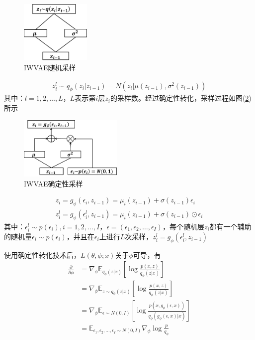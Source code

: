             \begin{figure}[H]
            \centering
            \includegraphics[height=3cm]{images/IWVAE_random_sampling.jpg}
            \caption{IWVAE随机采样}
            \label{fig:IWVAE随机采样}
            \end{figure}
            \begin{align*}
            z_i^l \sim q_\phi(z_i|z_{i-1}) = N(z_i|\mu(z_{i-1}),\sigma^2(z_{i-1}))
            \end{align*}
            其中：$l=1,2,\dots,L$，$L$表示第$i$层$z_i$的采样数。经过确定性转化，采样过程如图(\ref{fig:IWVAE确定性采样})所示
            \begin{figure}[H]
            \centering
            \includegraphics[height=3cm]{images/IWVAE_Deterministic_sampling.jpg}
            \caption{IWVAE确定性采样}
            \label{fig:IWVAE确定性采样}
            \end{figure}
            \begin{align*}
            z_i = g_\phi(\epsilon_i,z_{i-1}) = \mu_i(z_{i-1}) + \sigma(z_{i-1})\epsilon_i\\
            z_i^l = g_\phi(\epsilon_i^l,z_{i-1}) = \mu_i(z_{i-1}) + \sigma(z_{i-1}) \odot\epsilon_i
            \end{align*}
            其中：$\epsilon_i^l \sim p(\epsilon_i),i=1,2,\dots,I$，$\epsilon = (\epsilon_1,\epsilon_2,\dots,\epsilon_I)$，每个随机层$z_i$都有一个辅助的随机量$\epsilon_i\sim p(\epsilon_i)$，并且在$\epsilon_i$上进行$L$次采样，$z_i^l = g_\phi(\epsilon_i^l,z_{i-1})$
            \par
            使用确定性转化技术后，$L(\theta,\phi;x)$关于$\phi$可导，有
            \begin{align*}
            \frac{\partial }{\partial \phi} & = \nabla_\phi \mathbb{E} _{q_\phi(z|x)} \left[ \log \frac{p(x,z)}{q_\phi(z|x)} \right]\\
            & = \nabla_\phi \mathbb{E} _{z\sim q_\phi(z|x)} \left[ \log\frac{p(x,z)}{q_\phi(z|x)} \right]\\
            & = \nabla_\phi \mathbb{E}_{\epsilon\sim N(0,I)} \left[ \log\frac{p(x,g_\phi(\epsilon,x))}{q_\phi(g_\phi(\epsilon,x)|x)} \right]\\
            & = \mathbb{E} _{\epsilon_1,\epsilon_2,\dots,\epsilon_I \sim N(0,I)} \nabla_\phi \log\frac {p}{q_\phi}
            \end{align*}
